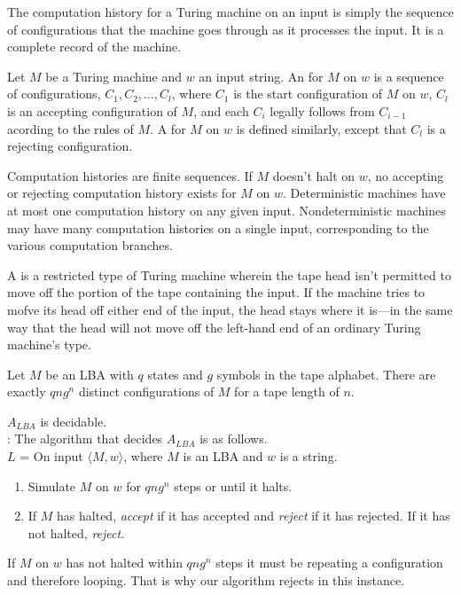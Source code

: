 \documentclass{article}
\begin{document}
The computation history for a Turing machine on an input is simply the sequence of configurations that the machine goes through as it processes the input. It is a complete record of the machine. 

\begin{definition}
  Let $M$ be a Turing machine and $w$ an input string. An  for $M$ on $w$ is a sequence of configurations, $C_1 , C_2 , \dots , C_{l}$, where $C_1$ is the start configuration of $M$ on $w$, $C_l$ is an accepting configuration of $M$, and each $C_i$ legally follows from $C_{i-1}$ acording to the rules of $M$. A  for $M$ on $w$ is defined similarly, except that $C_l$ is a rejecting configuration.
\end{definition}

Computation histories are finite sequences. If $M$ doesn't halt on $w$, no accepting or rejecting computation history exists for $M$ on $w$. Deterministic machines have at most one computation history on any given input. Nondeterministic machines may have many computation histories on a single input, corresponding to the various computation branches. 

\begin{definition}
  A  is a restricted type of Turing machine wherein the tape head isn't permitted to move off the portion of the tape containing the input. If the machine tries to mofve its head off either end of the input, the head stays where it is---in the same way that the head will not move off the left-hand end of an ordinary Turing machine's type. 
\end{definition}

\begin{lemma}
  Let $M$ be an LBA with $q$ states and $g$ symbols in the tape alphabet. There are exactly $qng^{n}$ distinct configurations of $M$ for a tape length of $n$. 
\end{lemma}

\begin{theorem}
  $A_{LBA}$ is decidable. \\ 
  : The algorithm that decides $A_{LBA}$ is as follows. \\ 
  $L$ = On input $\langle M,w \rangle$, where $M$ is an LBA and $w$ is a string. 
  \begin{enumerate}
    \item Simulate $M$ on $w$ for $qng^{n}$ steps or until it halts. 
    \item If $M$ has halted, \emph{accept} if it has accepted and \emph{reject} if it has rejected. If it has not halted, \emph{reject}. 
  \end{enumerate}
  If $M$ on $w$ has not halted within $qng^{n}$ steps it must be repeating a configuration and therefore looping. That is why our algorithm rejects in this instance. 
\end{theorem}

\end{document}
